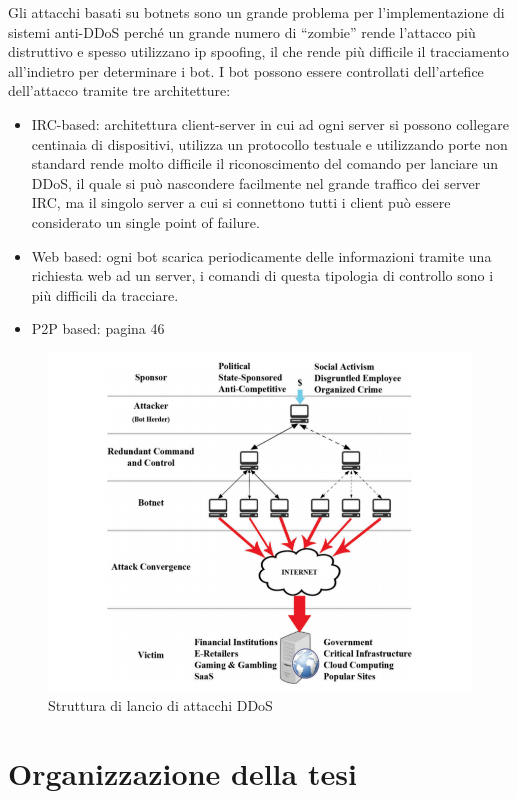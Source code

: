 Gli attacchi basati su botnets sono un grande problema per l'implementazione di sistemi anti-DDoS perché un grande numero di ``zombie'' rende l'attacco più distruttivo e spesso utilizzano ip spoofing, il che rende più difficile il tracciamento all'indietro per determinare i bot. \cite{ddos_survey_1}
I bot possono essere controllati dell'artefice dell'attacco tramite tre architetture: 
\begin{itemize}
    \item IRC-based: architettura client-server in cui ad ogni server si possono collegare centinaia di dispositivi, utilizza un protocollo testuale e utilizzando porte non standard rende molto difficile il riconoscimento del comando per lanciare un DDoS, il quale si può nascondere facilmente nel grande traffico dei server IRC, ma il singolo server a cui si connettono tutti i client può essere considerato un single point of failure.
    \item Web based: ogni bot scarica periodicamente delle informazioni tramite una richiesta web ad un server, i comandi di questa tipologia di controllo sono i più difficili da tracciare.
    \item P2P based: \cite{ddos_survey_4} pagina 46
\end{itemize}

\begin{figure}[h]
    \includegraphics[width=\hsize]{images/introduzione/struttura_botnets_2.png}
    \caption{Struttura di lancio di attacchi DDoS \cite{ddos_survey_4}}
    \centering
\end{figure}



\section{Organizzazione della tesi}

